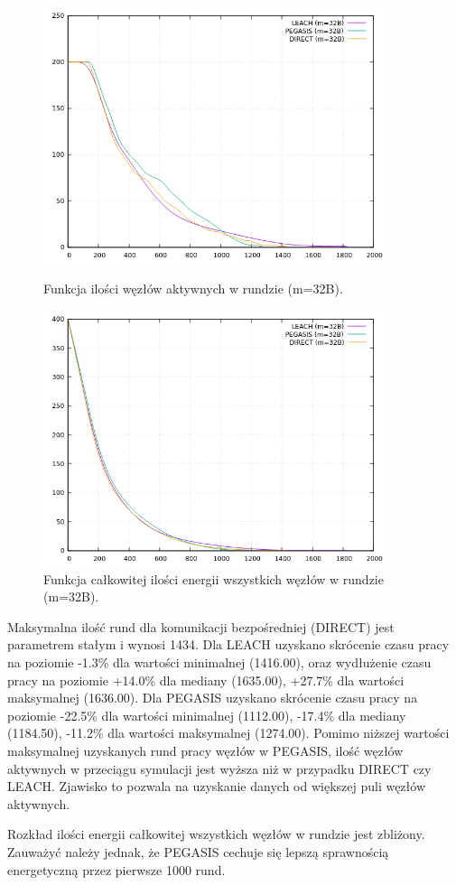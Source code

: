 \documentclass[a4paper,12pt,twoside,openany]{report}
\begin{document}
\begin{figure}[H]
 \centering
 \includegraphics[width=10cm]{images/gnuplot/test_1/nodes_in_round_m32.png}
 \caption{Funkcja ilości węzłów aktywnych w rundzie (m=32B).}
 \includegraphics[width=10cm]{images/gnuplot/test_1/energy_in_round_m32.png}
 \caption{Funkcja całkowitej ilości energii wszystkich węzłów w rundzie (m=32B).}
\end{figure}

\par
Maksymalna ilość rund dla komunikacji bezpośredniej (DIRECT) jest parametrem stałym i wynosi 1434.
Dla LEACH uzyskano skrócenie czasu pracy na poziomie -1.3\% dla wartości minimalnej (1416.00), oraz wydłużenie czasu pracy na poziomie +14.0\% dla mediany (1635.00), +27.7\% dla wartości maksymalnej (1636.00).
Dla PEGASIS uzyskano skrócenie czasu pracy na poziomie -22.5\% dla wartości minimalnej (1112.00), -17.4\% dla mediany (1184.50), -11.2\% dla wartości maksymalnej (1274.00).
Pomimo niższej wartości maksymalnej uzyskanych rund pracy węzłów w PEGASIS, ilość węzłów aktywnych w przeciągu symulacji jest wyższa niż w przypadku DIRECT czy LEACH.
Zjawisko to pozwala na uzyskanie danych od większej puli węzłów aktywnych.
\par 
Rozkład ilości energii całkowitej wszystkich węzłów w rundzie jest zbliżony.
Zauważyć należy jednak, że PEGASIS cechuje się lepszą sprawnością energetyczną przez pierwsze 1000 rund.
\end{document}
